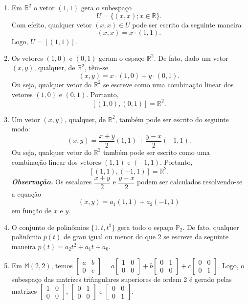 \begin{enumerate}
\item  Em $\mathbb{R}^2$ o vetor  $(1,1)$ gera o subespaço $$U= \{  (x,x); x \in \mathbb{R}\}.$$ Com efeito, qualquer vetor $(x,x) \in U$ pode ser escrito da seguinte maneira $$(x,x)=x\cdot (1,1).$$ Logo, $ U=[(1,1)]$.

\item Os vetores $(1,0)$ e $(0,1)$ geram o espaço $\mathbb{R}^2$. De fato, dado um  vetor $(x,y)$, qualquer, de $\mathbb{R}^2$, têm-se $$(x,y)=x \cdot(1,0)+ y\cdot (0,1).$$ Ou seja, qualquer vetor do $\mathbb{R}^2$ se escreve como uma combinação linear dos vetores $(1,0)$ e $(0,1)$. Portanto, $$[(1,0),(0,1)]=\mathbb{R}^2.$$

\item Um vetor $(x,y)$, qualquer, de $\mathbb{R}^2$, também pode ser escrito do seguinte modo: $$(x,y)=\dfrac{x+y}{2}(1,1)+ \dfrac{y-x}{2}(-1,1).$$ Ou seja, qualquer vetor do $\mathbb{R}^2$ também pode ser escrito como uma combinação linear dos vetores $(1,1)$ e $(-1,1)$. Portanto, $$[(1,1),(-1,1)]=\mathbb{R}^2.$$  \textbf{\textit{Observação.}} Os escalares $\dfrac{x+y}{2}$ e $\dfrac{y-x}{2}$ podem ser calculados resolvendo-se a equação $$(x,y)=a_1(1,1)+a_2(-1,1)$$ em função de $x$ e $y$.



\item O conjunto de polinômios $\{1, t, t^2\}$  gera todo o espaço  $\mathbb{P}_2$. De fato, qualquer polinômio $p(t)$ de grau igual ou menor do que 2 se escreve da seguinte maneira $p(t)=a_2t^2+a_1t+a_0$.

\item Em $\mathbb{M}(2,2)$, temos $\begin{bmatrix}a & b\\0 & c \end{bmatrix} = a\begin{bmatrix} 1 & 0 \\ 0 & 0\end{bmatrix}+b  \begin{bmatrix} 0 & 1\\ 0 & 0\end{bmatrix} + c \begin{bmatrix}0 & 0 \\ 0 & 1 \end{bmatrix}$. Logo, o subespaço das matrizes triângulares superiores de ordem 2 é gerado pelas matrizes $\begin{bmatrix} 1 & 0 \\ 0 & 0\end{bmatrix}$, $\begin{bmatrix} 0 & 1\\ 0 & 0\end{bmatrix}$ e $ \begin{bmatrix}0 & 0 \\ 0 & 1 \end{bmatrix}$.


\end{enumerate}
